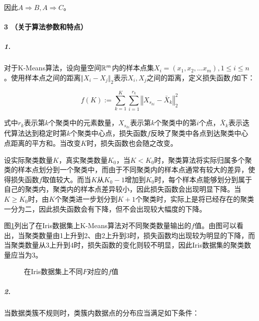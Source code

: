 \documentclass{../notes}
\newcommand{\irisresult}{
    (1, 681.37)
    (2, 152.35)
    (3, 78.85)
    (4, 57.26)
    (5, 46.45)
    (6, 39.04)
    (7, 34.53)
    (8, 30.32)
    (9, 27.86)
    (10, 26.49)
}
\begin{document}
    因此$A\Rightarrow B, A\Rightarrow C$。


    \separate

    \paragraph*{3 （关于算法参数和特点）}

    \subparagraph*{1.} 对于K-Means算法，设向量空间$\mathbb R^m$内的样本点集$X_i = (x_1, x_2, \dots x_m), 1\leq i \leq n$。使用样本点之间的距离$\Vert X_i - X_j\Vert_2$表示$X_i, X_j$之间的距离，定义损失函数$f$如下：

    \begin{equation}
        f(K) := \sum_{k=1}^K \sum_{i=1}^{r_k} \left\Vert X_{s_{ki}} - \bar X_{k} \right\Vert _2^2
    \end{equation}

    式中$r_k$表示第$k$个聚类中的元素数量，$X_{s_{ki}}$表示第$k$个聚类中的第$i$个点，$\bar X_k$表示迭代算法达到稳定时第$k$个聚类中心点，损失函数$f$反映了聚类中各点到达聚类中心点距离的平方和。当改变$K$时，损失函数也会随之改变。

    设实际聚类数量$K$，真实聚类数量$K_0$，当$K<K_0$时，聚类算法将实际归属多个聚类的样本点划分到一个聚类中，而由于不同聚类内的样本点通常有较大的差异，使得损失函数$f$取值较大。而当$K$从$K_0 - 1$增加到$K_0$时，每个样本点能够划分到属于自己的聚类内，聚类内的样本点差异较小，因此损失函数会出现明显下降。当$K\geq K_0$时，由$K$个聚类进一步划分到$K + 1$个聚类时，实际上是将已经存在的聚类一分为二，因此损失函数会有下降，但不会出现较大幅度的下降。
    
    图\ref{fig:k-to-f}列出了在Iris数据集上K-Means算法对不同聚类数量输出的$f$值。由图可以看出，当聚类数量由1上升到2、由2上升到3时，损失函数均出现较为明显的下降，而当聚类数量从3上升到4时，损失函数的变化则较不明显，因此Iris数据集的聚类数量应当为3。

    \begin{figure}
        \centering
        \caption{在Iris数据集上不同$F$对应的$f$值}
        \label{fig:k-to-f}
    \end{figure}

    \subparagraph*{2.}

    当数据类簇不规则时，类簇内数据点的分布应当满足如下条件：
\end{document}
